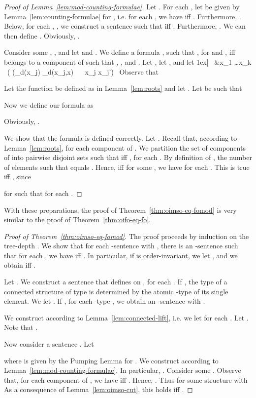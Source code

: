 \documentclass[11pt]{article}
\newcommand{\bigland}{\bigwedge}
\DeclareMathOperator{\reach}{reach}
\DeclareMathOperator{\tdroot}{roots}
\begin{document}
\begin{proof}[Proof of Lemma~\ref{lem:mod-counting-formulae}]  
  Let . For each , let  be given by
  Lemma~\ref{lem:counting-formulae} for , i.e. for each , we have 
  iff .
  Furthermore,
  .  Below, for
  each , ,
  we construct a sentence  such that  iff .  Furthermore,
  .  We
  can then define
  .
  Obviously, .
  
  Consider some ,
  , and let  and .  We define a
  formula , such that , for
   and , iff  belongs to a
  component  of  such that , , and .  Let , let , and let
  1ex]
    \land \ \exists &x_1 \ldots \exists x_k \ \Big( \smashoperator{\bigland_{j\in [k]}} \big(\tilde \tdroot_d(x_j) \land \reach_d(x_j,x) \ \land \ \smashoperator{\bigland_{j,j'\in [k],\, j\neq j'}} x_j \neq x_{j'}\big) \
  Observe that
  
  Let the function  be defined as in Lemma~\ref{lem:roots} and let
  . Let  be such that
  
  Now we define our formula
   as 
   
  Obviously, .

  We show that the formula is defined correctly. Let
  . Recall that, according to
  Lemma~\ref{lem:roots},  for each component
   of .  We partition the set  of components of 
  into pairwise disjoint sets  such that  iff , for each . By
  definition of , the number of elements  such
  that  equals . Hence,  iff for some ,
  we have  for each . This is true iff , since
  
  for  such that 
  for each .
\end{proof}

With these preparations, the proof of Theorem~\ref{thm:oimso-eq-fomod} is very
similar to the proof of Theorem~\ref{thm:oifo-eq-fo}.

\begin{proof}[Proof of Theorem~\ref{thm:oimso-eq-fomod}]
  The proof proceeds by induction on the tree-depth .  We show that for each
  -sentence  with , there is an
  -sentence  such that for each , we have  iff
  .  In particular, if  is order-invariant,
  we let , and we obtain  iff
  .
  
  Let .  We
  construct a sentence  that defines  on
  , for each . If , the type of a
  connected structure of type  is determined by the atomic -type
   of its single element. We let .  If , for each -type , we obtain an -sentence  with
  .
  
  We construct  according to Lemma~\ref{lem:connected-lift},
  i.e. we let  for each . Let .
  Note that . 

  Now consider a sentence .
  Let
   
  where  is given by the Pumping Lemma for .
  We construct  according to Lemma~\ref{lem:mod-counting-formulae}.
  In particular, .
  Consider some .
  Observe that, for each component  of , we have  iff . Hence,
  .
  Thus
   for some structure  with 
  As a consequence of Lemma~\ref{lem:oimso-cut}, this holds iff
  .
\end{proof}
\end{document}
